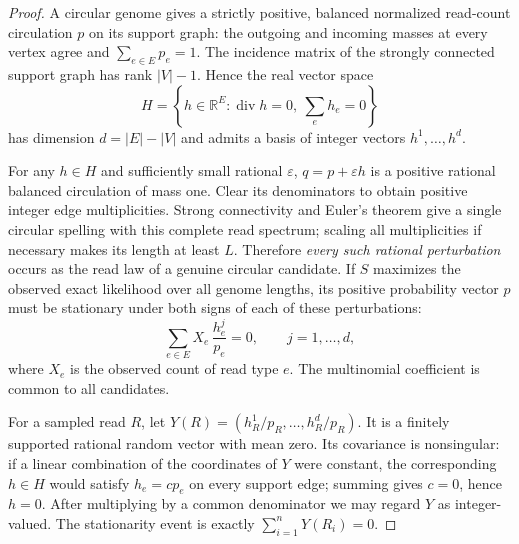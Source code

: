 \begin{proof}
A circular genome gives a strictly positive, balanced
normalized read-count circulation $p$ on its support graph:
the outgoing and incoming masses at every vertex agree and
$\sum_{e\in E}p_e=1$. The incidence matrix of the strongly
connected support graph has rank $|V|-1$. Hence the real
vector space
\[
 H=\left\{h\in\mathbb R^E:
   \operatorname{div}h=0,\ \sum_e h_e=0\right\}
\]
has dimension $d=|E|-|V|$ and admits a basis of integer vectors
$h^1,\ldots,h^d$.

For any $h\in H$ and sufficiently small rational $\varepsilon$,
$q=p+\varepsilon h$ is a positive rational balanced circulation
of mass one. Clear its denominators to obtain positive integer
edge multiplicities. Strong connectivity and Euler's theorem give
a single circular spelling with this complete read spectrum;
scaling all multiplicities if necessary makes its length at least
$L$. Therefore \emph{every such rational perturbation} occurs
as the read law of a genuine circular candidate. If $S$ maximizes
the observed exact likelihood over all genome lengths, its
positive probability vector $p$ must be stationary under both
signs of each of these perturbations:
\[
 \sum_{e\in E} X_e\,\frac{h^j_e}{p_e}=0,
       \qquad j=1,\ldots,d,
\]
where $X_e$ is the observed count of read type $e$.
The multinomial coefficient is common to all candidates.

For a sampled read $R$, let
$Y(R)=(h^1_R/p_R,\ldots,h^d_R/p_R)$.
It is a finitely supported rational random vector with mean
zero. Its covariance is nonsingular: if a linear combination
of the coordinates of $Y$ were constant, the corresponding
$h\in H$ would satisfy $h_e=c p_e$ on every support edge;
summing gives $c=0$, hence $h=0$. After multiplying by a
common denominator we may regard $Y$ as integer-valued.
The stationarity event is exactly
$\sum_{i=1}^nY(R_i)=0$.


\end{proof}
